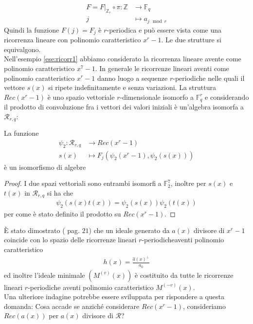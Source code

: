 \begin{align*}
F = F\bigr|_{\mathbb{Z}_{r}} \circ\pi: \mathbb{Z} &\longrightarrow \mathbb{F}_{q}  \\
              j &\longmapsto a_{j \mod{r}}
\end{align*}
Quindi la funzione $F(j) = F_{j}$ è $r$-periodica e può essere vista come una ricorrenza lineare con polinomio caratteristico $x^r -1$. Le due strutture si equivalgono.\\
Nell'esempio \ref{ese:ricorr1} abbiamo considerato la ricorrenza lineare avente come polinomio caratteristico $x^7 - 1$. In generale le ricorrenze lineari aventi come polinomio caratteristico $x^r-1$ danno luogo a sequenze $r$-periodiche nelle quali il vettore $s(x)$ si ripete indefinitamente e senza variazioni. La struttura $Rec(x^r-1)$ è uno spazio vettoriale $r$-dimensionale isomorfo a $\mathbb{F}_{q}^{r}$ e considerando il prodotto di convoluzione fra i vettori dei valori iniziali è un'algebra isomorfa a $\mathcal{R}_{r,q}$:
\begin{teorema}
   La funzione
   \begin{align*}
      \psi_{2}: \mathcal{R}_{r,q}  & \longrightarrow Rec(x^r-1)   \\
                           s(x)         &\longmapsto F_{j}(\psi_{2}(x^r-1),\psi_{2}(s(x)))
   \end{align*}
   è un isomorfismo di algebre
\end{teorema}
\begin{proof}
   I due spazi vettoriali sono entrambi isomorfi a  $\mathbb{F}_{2}^{7}$, inoltre per $s(x)$ e $t(x)$ in $\mathcal{R}_{r,q} $ si ha che
   \begin{align*}
      \psi_{2} (s(x) t(x)) = \psi_{2} (s(x)) \psi_{2} (t(x))
   \end{align*}
   per come è stato definito il prodotto su $Rec(x^r-1)$.
\end{proof}
È stato dimostrato (\cite{cerruti} pag. $21$) che un ideale generato da $a(x)$ divisore di $x^r-1$ coincide con lo spazio delle ricorrenze lineari $r$-periodicheaventi polinomio caratteristico 
\begin{align*}
   h(x) = \frac{\hat{a}(x)^{\perp}}{a_{0}}
\end{align*} 
ed inoltre l'ideale minimale $(M^{(v)}(x))$ è costituito da tutte le ricorrenze lineari $r$-periodiche aventi polinomio caratteristico $M^{(-v)}(x)$.\\
Una ulteriore indagine potrebbe essere sviluppata per rispondere a questa domanda: 
Cosa accade se anziché considerare $Rec(x^r-1)$, consideriamo $Rec(a(x))$ per $a(x)$ divisore di $\mathcal{R}$?

